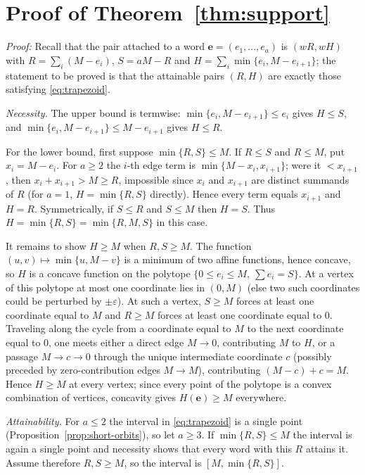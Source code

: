 \appendix

\section{Proof of Theorem~\ref{thm:support}}\label{app:support}

\noindent\emph{Proof:} Recall that the pair attached to a word
$\mathbf{e}=(e_1,\ldots,e_a)$ is $(wR,wH)$ with
$R=\sum_i(M-e_i)$, $S=aM-R$ and $H=\sum_i\min\{e_i,M-e_{i+1}\}$; the
statement to be proved is that the attainable pairs $(R,H)$ are exactly those
satisfying \eqref{eq:trapezoid}.

\emph{Necessity.}  The upper bound is termwise:
$\min\{e_i,M-e_{i+1}\}\leq e_i$ gives $H\leq S$, and
$\min\{e_i,M-e_{i+1}\}\leq M-e_{i+1}$ gives $H\leq R$.

For the lower bound, first suppose $\min\{R,S\}\leq M$.  If $R\leq S$ and
$R\leq M$, put $x_i=M-e_i$.  For $a\geq2$ the $i$-th edge term is
$\min\{M-x_i,x_{i+1}\}$; were it $<x_{i+1}$, then $x_i+x_{i+1}>M\geq R$,
impossible since $x_i$ and $x_{i+1}$ are distinct summands of $R$ (for $a=1$,
$H=\min\{R,S\}$ directly).  Hence every term equals $x_{i+1}$ and $H=R$.
Symmetrically, if $S\leq R$ and $S\leq M$ then $H=S$.  Thus
$H=\min\{R,S\}=\min\{R,M,S\}$ in this case.

It remains to show $H\geq M$ when $R,S\geq M$.  The function
$(u,v)\mapsto\min\{u,M-v\}$ is a minimum of two affine functions, hence
concave, so $H$ is a concave function on the polytope
$\{0\leq e_i\leq M,\ \sum e_i=S\}$.  At a vertex of this polytope at most one
coordinate lies in $(0,M)$ (else two such coordinates could be perturbed by
$\pm\varepsilon$).  At such a vertex, $S\geq M$ forces at least one coordinate
equal to $M$ and $R\geq M$ forces at least one coordinate equal to $0$.
Traveling along the cycle from a coordinate equal to $M$ to the next coordinate
equal to $0$, one meets either a direct edge $M\to0$, contributing $M$ to $H$,
or a passage $M\to c\to0$ through the unique intermediate coordinate $c$
(possibly preceded by zero-contribution edges $M\to M$), contributing
$(M-c)+c=M$.  Hence $H\geq M$ at every vertex; since every point of the
polytope is a convex combination of vertices, concavity gives
$H(\mathbf{e})\geq M$ everywhere.

\emph{Attainability.}  For $a\leq2$ the interval in \eqref{eq:trapezoid} is a
single point (Proposition~\ref{prop:short-orbits}), so let $a\geq3$.  If
$\min\{R,S\}\leq M$ the interval is again a single point and necessity shows
that every word with this $R$ attains it.  Assume therefore $R,S\geq M$, so
the interval is $[M,\min\{R,S\}]$.

